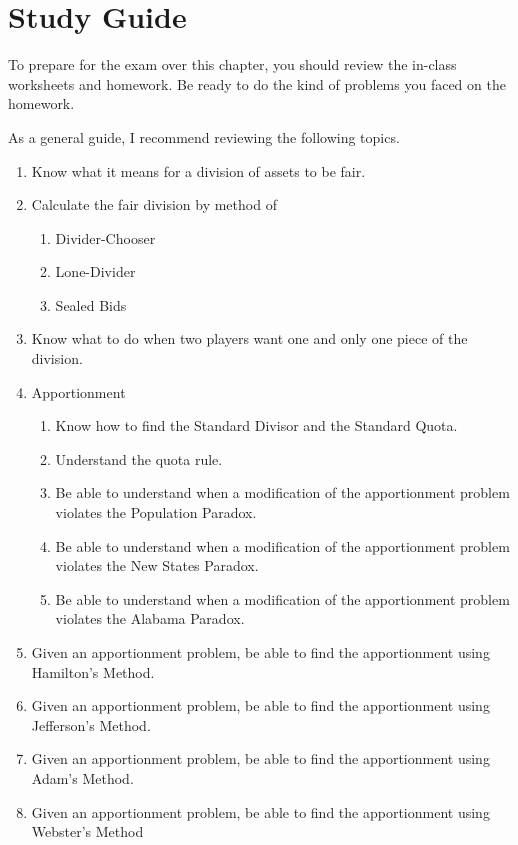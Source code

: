 \section{Study Guide} \label{sec:DivsionStudyGuide}


To prepare for the exam over this chapter,
you should review the in-class worksheets and homework.
Be ready to do the kind of problems you faced on the homework.

As a general guide, I recommend reviewing the following topics.

\begin{enumerate}
  \item Know what it means for a division of assets to be fair.
  \item Calculate the fair division by method of
        \begin{enumerate}
          \item Divider-Chooser
          \item Lone-Divider
          \item Sealed Bids
        \end{enumerate}
  \item Know what to do when two players want one and only one piece of the division.
  \item Apportionment
        \begin{enumerate}
          \item Know how to find the Standard Divisor and the Standard Quota.
          \item Understand the quota rule.
   				\item Be able to understand when a modification of the apportionment problem violates the Population Paradox.
   				\item Be able to understand when a modification of the apportionment problem violates the New States Paradox.
   				\item Be able to understand when a modification of the apportionment problem violates the Alabama Paradox.
        \end{enumerate}
   \item Given an apportionment problem, be able to find the apportionment using Hamilton's Method.
    \item Given an apportionment problem, be able to find the apportionment using Jefferson's Method.
    \item Given an apportionment problem, be able to find the apportionment using Adam's Method.
    \item Given an apportionment problem, be able to find the apportionment using Webster's Method
\end{enumerate}
